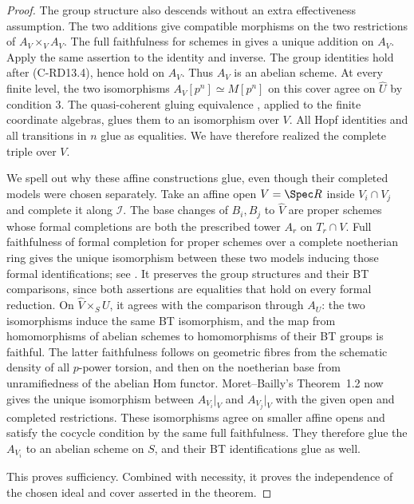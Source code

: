 \begin{proof}
The group structure also descends without an extra effectiveness
assumption. The two additions give compatible morphisms on the two
restrictions of $A_V\times_VA_V$. The full faithfulness for schemes
in \cite[Theorem~1.2, p.565]{MoretBailly1996Descent} gives a unique
addition on $A_V$. Apply the same assertion to the identity and
inverse. The group identities hold after (C-RD13.4), hence hold on
$A_V$. Thus $A_V$ is an abelian scheme. At every finite level, the
two isomorphisms $A_V[p^n]\simeq M[p^n]$ on this cover agree on
$\widehat U$ by condition 3. The quasi-coherent gluing equivalence
\cite[Theorem~0.3, p.561]{MoretBailly1996Descent}, applied to the
finite coordinate algebras, glues them to an isomorphism over $V$.
All Hopf identities and all transitions in $n$ glue as equalities.
We have therefore realized the complete triple over $V$.

We spell out why these affine constructions glue, even though their
completed models were chosen separately. Take an affine open
$V=\Spec R$ inside $V_i\cap V_j$ and complete it along $\mathcal I$.
The base changes of $B_i,B_j$ to $\widehat V$ are proper schemes
whose formal completions are both the prescribed tower $A_r$ on
$T_r\cap V$. Full faithfulness of formal completion for proper
schemes over a complete noetherian ring gives the unique
isomorphism between these two models inducing those formal
identifications; see \cite[Theorem~5.4.1, pp.156--157]{EGAIII1}.
It preserves the group structures and their BT comparisons, since
both assertions are equalities that hold on every formal reduction.
On $\widehat V\times_SU$, it agrees with the comparison through
$A_U$: the two isomorphisms induce the same BT isomorphism, and the
map from homomorphisms of abelian schemes to homomorphisms of their
BT groups is faithful. The latter faithfulness follows on geometric
fibres from the schematic density of all $p$-power torsion, and
then on the noetherian base from unramifiedness of the abelian Hom
functor. Moret--Bailly's Theorem~1.2 now gives the unique
isomorphism between $A_{V_i}|_V$ and $A_{V_j}|_V$ with the given
open and completed restrictions. These isomorphisms agree on
smaller affine opens and satisfy the cocycle condition by the same
full faithfulness. They therefore glue the $A_{V_i}$ to an abelian
scheme on $S$, and their BT identifications glue as well.

This proves sufficiency. Combined with necessity, it proves the
independence of the chosen ideal and cover asserted in the theorem.
\end{proof}

